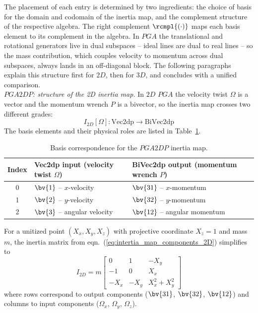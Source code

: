 The placement of each entry is determined by two ingredients: the choice of basis for the
domain and codomain of the inertia map, and the complement structure of the respective
algebra. The right complement $\rcmpl{(\cdot)}$ maps each basis element to its complement
in the algebra. In $PGA$ the translational and rotational generators live in dual
subspaces -- ideal lines are dual to real lines -- so the mass contribution, which couples
velocity to momentum across dual subspaces, always lands in an off-diagonal block. The
following paragraphs explain this structure first for $2D$, then for $3D$, and concludes
with a unified comparison. \\

\emph{$PGA2DP$: structure of the 2D inertia map.}
In $2D$ $PGA$ the velocity twist $\Omega$ is a vector and the momentum wrench $P$ is a
bivector, so the inertia map crosses two different grades:
\begin{equation}
    I_{2D}[\Omega] : \mathrm{Vec2dp} \to \mathrm{BiVec2dp}
\end{equation}
The basis elements and their physical roles are listed in Table~\ref{tab:basis_pga2dp}.

\begin{table}[!ht]
\centering\small
\begin{tabular}{c|p{5.2cm}|p{5.2cm}}
\hline
Index & Vec2dp input (velocity twist $\Omega$) & BiVec2dp output (momentum wrench $P$) \\
\hline
0 & $\bv{1}$ -- $x$-velocity & $\bv{31}$ -- $x$-momentum \\
1 & $\bv{2}$ -- $y$-velocity & $\bv{32}$ -- $y$-momentum \\
2 & $\bv{3}$ -- angular velocity  & $\bv{12}$ -- angular momentum \\
\hline
\end{tabular}
\caption{Basis correspondence for the $PGA2DP$ inertia map.}
\label{tab:basis_pga2dp}
\end{table}

For a unitized point $(X_x, X_y, X_z)$ with projective coordinate $X_z = 1$ and mass $m$,
the inertia matrix from eqn.~(\ref{eq:intertia_map_components_2D}) simplifies to
\begin{equation}
    I_{2D} = m
    \begin{bmatrix}
        0    &  1   & -X_y           \\
        -1   &  0   &  X_x           \\
        -X_x & -X_y & X_x^2 + X_y^2
    \end{bmatrix}
    \label{eq:inertia_2D_unitized}
\end{equation}
where rows correspond to output components ($\bv{31}$, $\bv{32}$, $\bv{12}$) and columns
to input components ($\Omega_x$, $\Omega_y$, $\Omega_z$). \\

